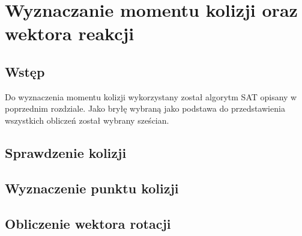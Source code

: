 \chapter{Wyznaczanie momentu kolizji oraz wektora reakcji}
\label{t:int}

\section{Wstęp}
Do wyznaczenia momentu kolizji wykorzystany został algorytm SAT opisany w poprzednim rozdziale. Jako bryłę wybraną jako podstawa do przedstawienia wszystkich obliczeń został wybrany sześcian.

\section{Sprawdzenie kolizji}

\section{Wyznaczenie punktu kolizji}

\section{Obliczenie wektora rotacji}